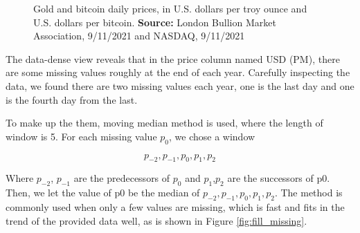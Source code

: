 \documentclass[12pt,a4paper]{article}
\begin{document}
\begin{spacing}{1.2}
\begin{figure}[H]
	\caption{Gold and bitcoin daily prices, in U.S. dollars per troy ounce and U.S. dollars per bitcoin. \textbf{Source:} London Bullion Market 
		Association, 9/11/2021 and NASDAQ, 9/11/2021 }
	\label{figure:missing_data_dense}
\end{figure}


The data-dense view reveals that in the price column named USD (PM), there are some missing values roughly at the end of each year. Carefully inspecting the data, we found there are two missing values each year, one is the last day and one is the fourth day from the last.

To make up the them, moving median method is used, where the length of window is 5.
For each missing value $p_0$, we chose a window

$$
p_{-2},p_{-1},p_{0},p_{1},p_{2}
$$

Where $p_{-2}$, $p_{-1}$ are the predecessors of $p_{0}$ and $p_{1}$,$p_{2}$ are the successors of p0. Then, we let the
value of p0 be the median of ${p_{-2},p_{-1},p_{0},p_{1},p_{2}}$.
The method is commonly used when only a few values are missing, which is fast and fits in the trend of the provided data well, as is shown in Figure \ref{fig:fill_missing}.


\end{spacing}
\end{document}
